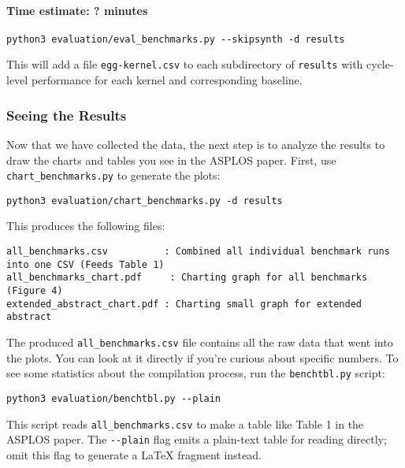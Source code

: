 \hypertarget{time-estimate-minutes}{%
\paragraph{Time estimate: ? minutes}\label{time-estimate-minutes}}

\begin{verbatim}
python3 evaluation/eval_benchmarks.py --skipsynth -d results
\end{verbatim}

This will add a file \texttt{egg-kernel.csv} to each subdirectory of
\texttt{results} with cycle-level performance for each kernel and
corresponding baseline.

\hypertarget{seeing-the-results}{%
\subsubsection{Seeing the Results}\label{seeing-the-results}}

Now that we have collected the data, the next step is to analyze the
results to draw the charts and tables you see in the ASPLOS paper.
First, use \texttt{chart\_benchmarks.py} to generate the plots:

\begin{verbatim}
python3 evaluation/chart_benchmarks.py -d results
\end{verbatim}

This produces the following files:

\begin{verbatim}
all_benchmarks.csv          : Combined all individual benchmark runs into one CSV (Feeds Table 1)
all_benchmarks_chart.pdf     : Charting graph for all benchmarks (Figure 4)
extended_abstract_chart.pdf : Charting small graph for extended abstract
\end{verbatim}

The produced \texttt{all\_benchmarks.csv} file contains all the raw data
that went into the plots. You can look at it directly if you're curious
about specific numbers. To see some statistics about the compilation
process, run the \texttt{benchtbl.py} script:

\begin{verbatim}
python3 evaluation/benchtbl.py --plain
\end{verbatim}

This script reads \texttt{all\_benchmarks.csv} to make a table like
Table 1 in the ASPLOS paper. The \texttt{-\/-plain} flag emits a
plain-text table for reading directly; omit this flag to generate a
LaTeX fragment instead.

